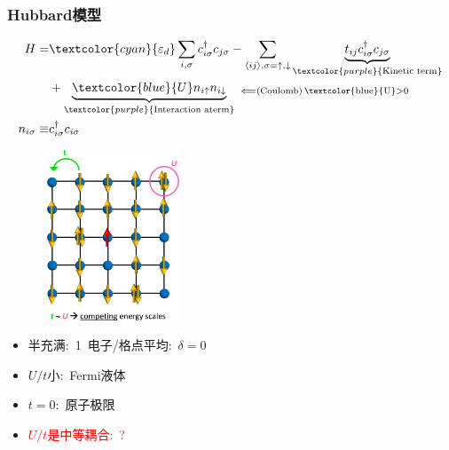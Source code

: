 \frame
{
	\frametitle{\textrm{Hubbard}模型}
\begin{minipage}[b]{0.58\linewidth}
	\begin{displaymath}
		\begin{aligned}
			H=&\textcolor{cyan}{\varepsilon_d}\sum_{i,\sigma}c_{i\sigma}^{\dag}c_{j\sigma}-\sum_{\langle ij\rangle,\sigma=\uparrow,\downarrow}\underbrace{t_{ij}c_{i\sigma}^{\dag}c_{j\sigma}}_{\fontsize{6.2pt}{4.2pt}\selectfont{\textcolor{purple}{\mathrm{Kinetic~term}}}}\\
			&+\underbrace{\textcolor{blue}{U}n_{i\uparrow}n_{i\downarrow}}_{\fontsize{6.2pt}{4.2pt}\selectfont{\textcolor{purple}{\mathrm{Interaction~aterm}}}}~_{\fontsize{3.2pt}{2.2pt}\selectfont{\Longleftarrow\mathrm{(Coulomb)~\textcolor{blue}{U}>0}}} \\
			n_{i\sigma}\equiv&c_{i\sigma}^{\dag}c_{i\sigma}\\
		\end{aligned}
	\end{displaymath}
			{\fontsize{7.2pt}{5.2pt}}
\end{minipage}
\hfill
\begin{minipage}[t]{0.40\linewidth}
\begin{figure}[h!]
\centering
\vspace{-120pt}
\includegraphics[height=2.0in,width=1.65in,viewport=0 0 600 750,clip]{Figures/Hubbard_U-t.png}
\label{Hubbard-U}
\end{figure}
\end{minipage}
\vspace*{-25pt}
\begin{itemize}
	\item 半充满:~1~电子/格点平均:~$\delta=0$
	\item $U/t$小:~\textrm{Fermi}液体
	\item $t=0$:~原子极限
	\item \textcolor{red}{$U/t$是中等耦合:~?}
\end{itemize}
}

